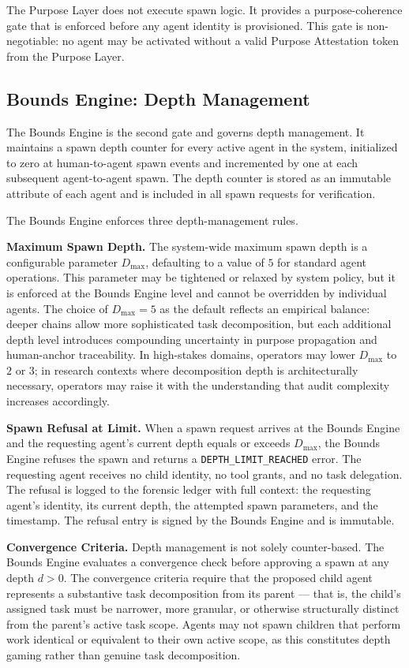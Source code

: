 The Purpose Layer does not execute spawn logic. It provides a purpose-coherence gate that is enforced before any agent identity is provisioned. This gate is non-negotiable: no agent may be activated without a valid Purpose Attestation token from the Purpose Layer.

\subsection{Bounds Engine: Depth Management}

The Bounds Engine is the second gate and governs depth management. It maintains a spawn depth counter for every active agent in the system, initialized to zero at human-to-agent spawn events and incremented by one at each subsequent agent-to-agent spawn. The depth counter is stored as an immutable attribute of each agent and is included in all spawn requests for verification.

The Bounds Engine enforces three depth-management rules.

\textbf{Maximum Spawn Depth.} The system-wide maximum spawn depth is a configurable parameter $D_{\max}$, defaulting to a value of $5$ for standard agent operations. This parameter may be tightened or relaxed by system policy, but it is enforced at the Bounds Engine level and cannot be overridden by individual agents. The choice of $D_{\max} = 5$ as the default reflects an empirical balance: deeper chains allow more sophisticated task decomposition, but each additional depth level introduces compounding uncertainty in purpose propagation and human-anchor traceability. In high-stakes domains, operators may lower $D_{\max}$ to $2$ or $3$; in research contexts where decomposition depth is architecturally necessary, operators may raise it with the understanding that audit complexity increases accordingly.

\textbf{Spawn Refusal at Limit.} When a spawn request arrives at the Bounds Engine and the requesting agent's current depth equals or exceeds $D_{\max}$, the Bounds Engine refuses the spawn and returns a \texttt{DEPTH\_LIMIT\_REACHED} error. The requesting agent receives no child identity, no tool grants, and no task delegation. The refusal is logged to the forensic ledger with full context: the requesting agent's identity, its current depth, the attempted spawn parameters, and the timestamp. The refusal entry is signed by the Bounds Engine and is immutable.

\textbf{Convergence Criteria.} Depth management is not solely counter-based. The Bounds Engine evaluates a convergence check before approving a spawn at any depth $d > 0$. The convergence criteria require that the proposed child agent represents a substantive task decomposition from its parent — that is, the child's assigned task must be narrower, more granular, or otherwise structurally distinct from the parent's active task scope. Agents may not spawn children that perform work identical or equivalent to their own active scope, as this constitutes depth gaming rather than genuine task decomposition.

